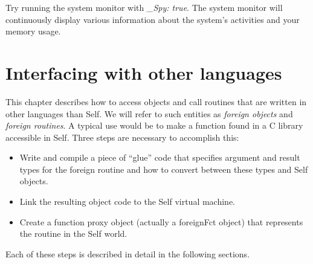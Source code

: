 \documentclass[letterpaper,10pt,english]{sphinxmanual}
\begin{document}
Try running the system monitor with \emph{\_Spy: true}. The system monitor will continuously display
various information about the system’s activities and your memory usage.


\section{Interfacing with other languages}
\label{vmref:interfacing-with-other-languages}\label{vmref:index-56}
This chapter describes how to access objects and call routines that are written in other languages
than Self. We will refer to such entities as \emph{foreign objects} and \emph{foreign routines}. A typical use
would be to make a function found in a C library accessible in Self. Three steps are necessary to
accomplish this:
\begin{itemize}
\item {} 
Write and compile a piece of “glue” code that specifies argument and result types for the foreign routine and how to convert between these types and Self objects.

\item {} 
Link the resulting object code to the Self virtual machine.

\item {} 
Create a function proxy object (actually a foreignFct object) that represents the routine in the Self world.

\end{itemize}

Each of these steps is described in detail in the following sections.

\end{document}
